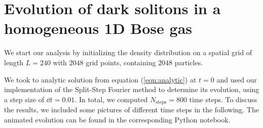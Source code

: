 \section{Evolution of dark solitons in a homogeneous 1D Bose gas}

We start our analysis by initializing the density distribution on a spatial grid of length $L = 240$ with $2048$ grid points, containing $2048$ particles.

We took to analytic solution from equation (\ref{eqn:analytic}) at $t=0$ and used our implementation of the Split-Step Fourier method to determine its evolution, using a step size of $\dd t = 0.01$. In total, we computed $N_{\text{steps}} = 800$ time steps. To discuss the results, we included some pictures of different time steps in the following. The animated evolution can be found in the corresponding Python notebook.

